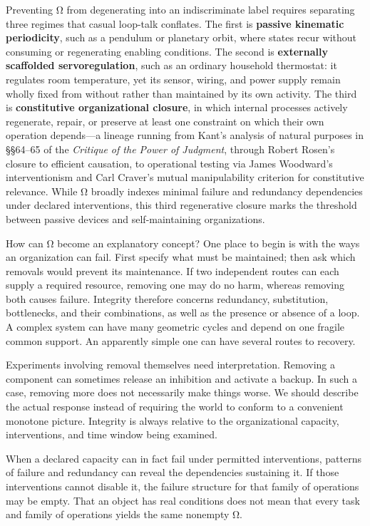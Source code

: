 \documentclass[
  english,
  11pt,
  oneside]{book}
\newcounter{none} %
\begin{document}
Preventing Ω from degenerating into an indiscriminate label requires separating three regimes that casual loop-talk conflates. The first is \textbf{passive kinematic periodicity}, such as a pendulum or planetary orbit, where states recur without consuming or regenerating enabling conditions. The second is \textbf{externally scaffolded servoregulation}, such as an ordinary household thermostat: it regulates room temperature, yet its sensor, wiring, and power supply remain wholly fixed from without rather than maintained by its own activity. The third is \textbf{constitutive organizational closure}, in which internal processes actively regenerate, repair, or preserve at least one constraint on which their own operation depends---a lineage running from Kant's analysis of natural purposes in §§64--65 of the \emph{Critique of the Power of Judgment}, through Robert Rosen's closure to efficient causation, to operational testing via James Woodward's interventionism and Carl Craver's mutual manipulability criterion for constitutive relevance. While Ω broadly indexes minimal failure and redundancy dependencies under declared interventions, this third regenerative closure marks the threshold between passive devices and self-maintaining organizations.

How can Ω become an explanatory concept? One place to begin is with the ways an organization can fail. First specify what must be maintained; then ask which removals would prevent its maintenance. If two independent routes can each supply a required resource, removing one may do no harm, whereas removing both causes failure. Integrity therefore concerns redundancy, substitution, bottlenecks, and their combinations, as well as the presence or absence of a loop. A complex system can have many geometric cycles and depend on one fragile common support. An apparently simple one can have several routes to recovery.

Experiments involving removal themselves need interpretation. Removing a component can sometimes release an inhibition and activate a backup. In such a case, removing more does not necessarily make things worse. We should describe the actual response instead of requiring the world to conform to a convenient monotone picture. Integrity is always relative to the organizational capacity, interventions, and time window being examined.

When a declared capacity can in fact fail under permitted interventions, patterns of failure and redundancy can reveal the dependencies sustaining it. If those interventions cannot disable it, the failure structure for that family of operations may be empty. That an object has real conditions does not mean that every task and family of operations yields the same nonempty Ω.
\end{document}

